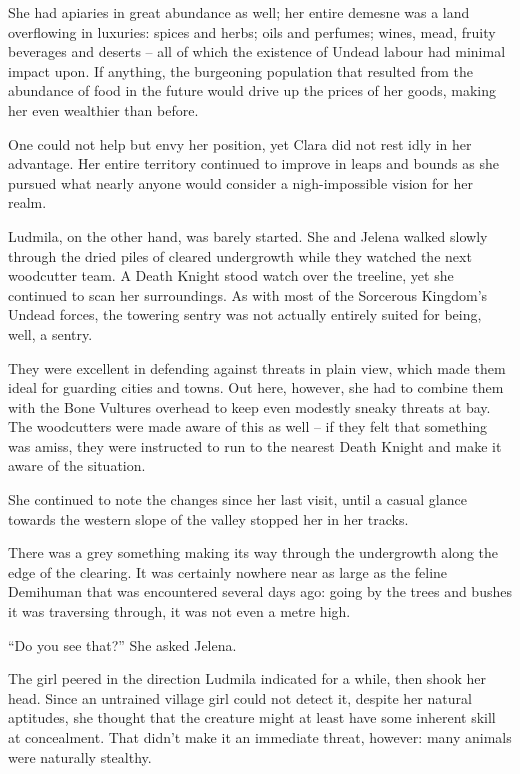  

She had apiaries in great abundance as well; her entire demesne was a land overflowing in luxuries: spices and herbs; oils and perfumes; wines, mead, fruity beverages and deserts – all of which the existence of Undead labour had minimal impact upon. If anything, the burgeoning population that resulted from the abundance of food in the future would drive up the prices of her goods, making her even wealthier than before.

 

One could not help but envy her position, yet Clara did not rest idly in her advantage. Her entire territory continued to improve in leaps and bounds as she pursued what nearly anyone would consider a nigh-impossible vision for her realm.

 

Ludmila, on the other hand, was barely started. She and Jelena walked slowly through the dried piles of cleared undergrowth while they watched the next woodcutter team. A Death Knight stood watch over the treeline, yet she continued to scan her surroundings. As with most of the Sorcerous Kingdom’s Undead forces, the towering sentry was not actually entirely suited for being, well, a sentry.

 

They were excellent in defending against threats in plain view, which made them ideal for guarding cities and towns. Out here, however, she had to combine them with the Bone Vultures overhead to keep even modestly sneaky threats at bay. The woodcutters were made aware of this as well – if they felt that something was amiss, they were instructed to run to the nearest Death Knight and make it aware of the situation.

 

She continued to note the changes since her last visit, until a casual glance towards the western slope of the valley stopped her in her tracks.

 

There was a grey something making its way through the undergrowth along the edge of the clearing. It was certainly nowhere near as large as the feline Demihuman that was encountered several days ago: going by the trees and bushes it was traversing through, it was not even a metre high.

 

“Do you see that?” She asked Jelena.

 

The girl peered in the direction Ludmila indicated for a while, then shook her head. Since an untrained village girl could not detect it, despite her natural aptitudes, she thought that the creature might at least have some inherent skill at concealment. That didn’t make it an immediate threat, however: many animals were naturally stealthy.

